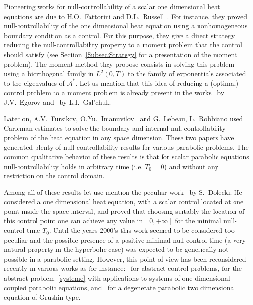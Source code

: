 \documentclass[10pt]{amsart}
\theoremstyle{definition}\newtheorem{defi}[theo]{Definition}\newtheorem{rema}[theo]{Remark}\newtheorem{exam}[theo]{Example}\newtheorem{exem}[theo]{Example}\newtheorem{nota}[theo]{Notation}
\newcommand\As{\mathcal{A}^*}
\begin{document}
Pioneering works for null-controllability of a scalar one dimensional heat equations are due to H.O.~Fattorini and D.L.~Russell~\cite{FattoriniRussell71, FattoriniRussell74}. For instance, they proved null-controllability of the one dimensional heat equation using a nonhomogeneous boundary condition as a control. For this purpose, they give a direct strategy reducing the null-controllability property to a moment problem that the control should satisfy (see Section~\ref{Subsec:Strategy} for a presentation of the moment problem). The moment method they propose consists in solving this problem using a biorthogonal family in $L^2(0,T)$ to the family of exponentials associated to the eigenvalues of $\As$. Let us mention that this idea of reducing a (optimal) control problem to a moment problem is already present in the works~\cite{Egorov63} by J.V.~Egorov and~\cite{Galchuk69} by L.I.~Gal'chuk.

Later on, A.V.~Fursikov, O.Yu.~Imanuvilov~\cite{FursikovImanuvilov96} and G.~Lebeau, L.~Robbiano \cite{LebeauRobbiano95} used Carleman estimates to solve the boundary and internal null-controllab\-ility problem of the heat equation in any space dimension. These two papers have generated plenty of null-controllability results for various parabolic problems. The common qualitative behavior of these results is that for scalar parabolic equations null-controllability holds in arbitrary time (i.e. $T_0 = 0$) and without any restriction on the control domain.

Among all of these results let use mention the peculiar work~\cite{Dolecki73} by S.~Dolecki. He considered a one dimensional heat equation, with a scalar control located at one point inside the space interval, and proved that choosing suitably the location of this control point one can achieve any value in $[0,+\infty]$ for the minimal null-control time $T_0$. Until the years 2000's this work seemed to be considered too peculiar and the possible presence of a positive minimal null-control time (a very natural property in the hyperbolic case) was expected to be generically not possible in a parabolic setting. However, this point of view has been reconsidered recently in various works as for instance:~\cite{AKBDK05} for abstract control problems, \cite{AmmarKhodjaBenabdallahGonzalez-BurgosdeTeresa:2014} for the abstract problem~\eqref{systeme} with applications to systems of one dimensional coupled parabolic equations, and~\cite{BeauchardCannarsaGuglielmi} for a degenerate parabolic two dimensional equation of Grushin type.
\end{document}
